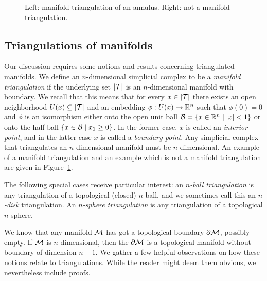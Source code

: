 \documentclass[10pt,a4paper]{article}
\begin{document}
\begin{figure}[h]
\caption{Left: manifold triangulation of an annulus. Right: not a manifold triangulation.}
\label{figure:not_manifold_triang}
\end{figure}


\subsection{Triangulations of manifolds}\label{subsection:manifoldtriangulation}

Our discussion requires some notions and results concerning triangulated manifolds. 
We define an $n$-dimensional simplicial complex to be a \emph{manifold triangulation} if the underlying set $\left| {\mathcal T} \right|$ is an $n$-dimensional manifold with boundary.
We recall that this means that for every $x \in \left| {\mathcal T} \right|$
there exists an open neighborhood $U(x) \subseteq \left| {\mathcal T} \right|$ and an embedding $\phi : U(x) \rightarrow {\mathbb R}^{n}$
such that $\phi(0) = 0$ and $\phi$ is an isomorphism either onto the open unit ball $\calB = \{ x \in \bbR^{n} \suchthat |x| < 1 \}$
or onto the half-ball $\{ x \in \calB \suchthat x_1 \geq 0 \}$.
In the former case, $x$ is called an \emph{interior point}, and in the latter case $x$ is called a \emph{boundary point}. 
Any simplicial complex that triangulates an $n$-dimensional manifold must be $n$-dimensional. 
An example of a manifold triangulation and an example which is not a manifold triangulation are given in Figure~\ref{figure:not_manifold_triang}.

The following special cases receive particular interest:
an \emph{$n$-ball triangulation} is any triangulation of a topological (closed) $n$-ball, and we sometimes call this an \emph{$n$-disk} triangulation.
An \emph{$n$-sphere triangulation} is any triangulation of a topological $n$-sphere. 


We know that any manifold ${\mathcal M}$ has got a topological boundary $\partial{\mathcal M}$, possibly empty. 
If ${\mathcal M}$ is $n$-dimensional, then the $\partial{\mathcal M}$ is a topological manifold without boundary of dimension $n-1$. 
We gather a few helpful observations on how these notions relate to triangulations.
While the reader might deem them obvious, we nevertheless include proofs. 
\end{document}
